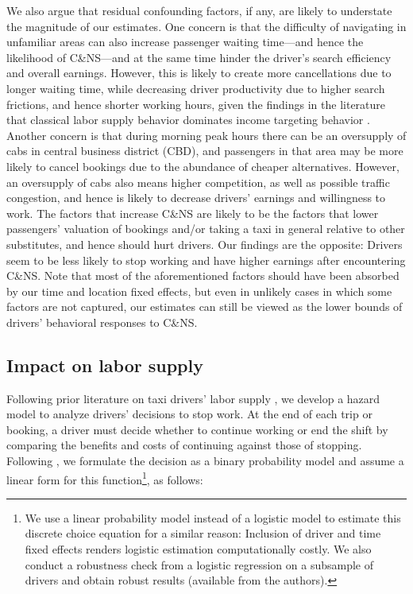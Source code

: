 \documentclass[reviewmode,AEJ]{AEA}
\begin{document}
We also argue that residual confounding factors, if any, are likely to understate the magnitude of our estimates.
One concern is that the difficulty of navigating in unfamiliar areas can also increase passenger waiting time---and 
hence the likelihood of C\&NS---and at the same time hinder the driver's search efficiency and overall earnings. 
However, this is likely to create more cancellations due to longer waiting time, while decreasing driver 
productivity due to higher search frictions, and hence shorter working hours, given the findings in the 
literature that classical labor supply behavior dominates income targeting behavior \citep{farber2015you}.
Another concern is that during morning peak hours there can be an oversupply of cabs in central business 
district (CBD), and passengers in that area may be more likely to cancel bookings due to the abundance of
cheaper alternatives. However, an oversupply of cabs also means higher competition, as well as possible
traffic congestion, and hence is likely to decrease drivers' earnings and willingness to work.  
The factors that increase C\&NS are likely to be the factors that lower passengers' valuation of bookings
and/or taking a taxi in general relative to other substitutes, and hence should hurt drivers.
Our findings are the opposite: Drivers seem to be less likely to stop working and have higher earnings after 
encountering C\&NS. Note that most of the aforementioned factors should have been absorbed by our
time and location fixed effects, but even in unlikely cases in which some factors are not captured, 
our estimates can still be viewed as the lower bounds of drivers' behavioral responses to C\&NS.


\subsection{Impact on labor supply}
Following prior literature on taxi drivers' labor supply \citep{farber2005tomorrow,farber2015you,agarwal2015singaporean,chen2015dynamic}, we develop a hazard model 
to analyze drivers' decisions to stop work. At the end of each trip or booking, a driver must decide whether
to continue working or end the shift by comparing the benefits and costs of continuing against those of stopping. 
Following \citet{farber2005tomorrow,farber2015you}, we  
formulate the decision as a  binary probability model 
and assume a linear form for this function\footnote{We
use a linear probability model instead of a logistic model to estimate this discrete choice equation
for a similar reason: Inclusion of driver and time fixed effects renders logistic estimation computationally
costly. We also conduct a robustness check from a logistic regression on a subsample of drivers 
and obtain robust results (available from the authors).}, as follows:
\end{document}
